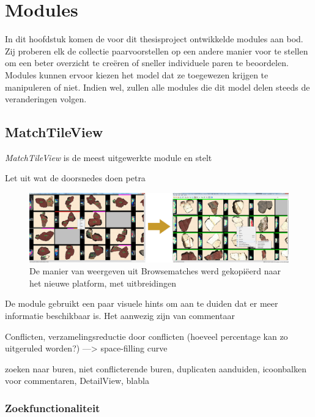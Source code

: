 \chapter{Modules}
\label{hoofdstuk:modules}
In dit hoofdstuk komen de voor dit thesisproject ontwikkelde modules aan bod. Zij proberen elk de collectie paarvoorstellen op een andere manier voor te stellen om een beter overzicht te cre\"eren of sneller individuele paren te beoordelen.\\

Modules kunnen ervoor kiezen het model dat ze toegewezen krijgen te manipuleren of niet. Indien wel, zullen alle modules die dit model delen steeds de veranderingen volgen.

\section{MatchTileView}
\emph{MatchTileView} is de meest uitgewerkte module en stelt 

Let uit wat de doorsnedes doen petra~\cite{Brown2010}

\begin{figure}[ht]
	\begin{center}
		\includegraphics[width=1.0\columnwidth]{images/browsematches-to-tangerine-01.png}
		\caption{De manier van weergeven uit Browsematches werd gekopi\"eerd naar het nieuwe platform, met uitbreidingen}
		\label{fig:browsematchestotang}
	\end{center}
\end{figure}

De module gebruikt een paar visuele hints om aan te duiden dat er meer informatie beschikbaar is.
Het aanwezig zijn van commentaar 

Conflicten, verzamelingsreductie door conflicten (hoeveel percentage kan zo uitgeruled worden?) ---> space-filling curve

zoeken naar buren, niet conflicterende buren, duplicaten aanduiden, icoonbalken voor commentaren, DetailView, blabla

\subsection{Zoekfunctionaliteit}

